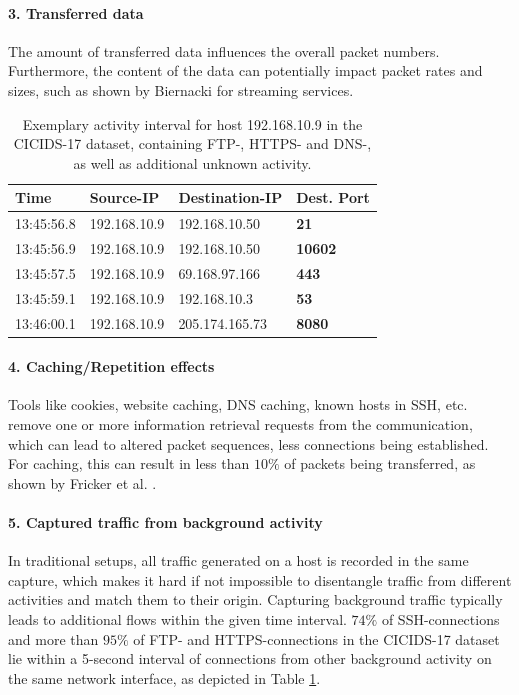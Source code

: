 \documentclass[sigconf]{acmart}
\begin{document}
\paragraph{3. Transferred data} 
The amount of transferred data influences the overall packet numbers. Furthermore, the content of the data can potentially impact packet rates and sizes, such as shown by Biernacki \cite{biernacki2017analysis} for streaming services.


\begin{table}[h!]
\centering
\begin{tabular}{l|l|l|>{\bfseries}l}
Time&  Source-IP &Destination-IP& Dest. Port\\ \hline
13:45:56.8 & 192.168.10.9 &  192.168.10.50 &       21 \\ \hline
13:45:56.9 & 192.168.10.9 &  192.168.10.50 &    10602\\ \hline
13:45:57.5 & 192.168.10.9 &  69.168.97.166 &      443\\ \hline
13:45:59.1 & 192.168.10.9 &   192.168.10.3 &       53\\ \hline
13:46:00.1 & 192.168.10.9 & 205.174.165.73 &     8080\\ \hline
\end{tabular}
\caption{Exemplary activity interval for host 192.168.10.9 in the CICIDS-17 dataset, containing FTP-, HTTPS- and DNS-, as well as additional unknown activity.}\label{Tab:Sess}
\end{table}

\paragraph{4. Caching/Repetition effects}
Tools like cookies, website caching, DNS caching, known hosts in SSH, etc. remove one or more information retrieval requests from the communication, which can lead to altered packet sequences, less connections being established. For caching, this can result in less than $10\%$ of packets being transferred, as shown by Fricker et al. \cite{fricker2012impact}. 




\paragraph{5. Captured traffic from background activity} 
In traditional setups, all traffic generated on a host is recorded in the same capture, which makes it hard if not impossible to disentangle traffic from different activities and match them to their origin. Capturing background traffic typically leads to additional flows within the given time interval. $74\%$ of SSH-connections and more than $95\%$ of FTP- and HTTPS-connections in the CICIDS-17 dataset lie within a 5-second interval of connections from other background activity on the same network interface, as depicted in Table \ref{Tab:Sess}.
\end{document}
